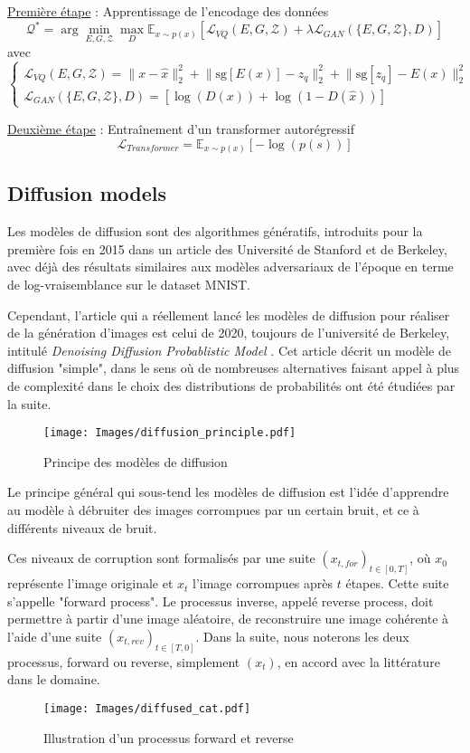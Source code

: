 \documentclass{article}
\begin{document}
\underline{Première étape} : Apprentissage de l'encodage des données
\large
$$
\mathcal{Q}^* = \arg \min_{E, G, \mathcal{Z}} \max_{D} \mathbb{E}_{x \sim p(x)}[\mathcal{L}_{VQ}(E, G, \mathcal{Z}) + \lambda \mathcal{L}_{GAN}(\{E, G, \mathcal{Z}\}, D)]
$$
\normalsize
avec
\large
$$
\begin{cases}
\mathcal{L}_{VQ}(E, G, \mathcal{Z}) = \lVert x - \hat{x} \rVert_2^2 +  \lVert\text{sg}[E(x)] - z_q \rVert_2^2 + \lVert\text{sg}[z_q] - E(x) \rVert_2^2 \\
\mathcal{L}_{GAN}(\{E, G, \mathcal{Z}\}, D) = [\log(D(x)) + \log(1 - D(\hat{x}))]
\end{cases}
$$
\normalsize


\underline{Deuxième étape} : Entraînement d'un transformer autorégressif
\large
$$
\mathcal{L}_{Transformer} = \mathbb{E}_{x \sim p(x)}[-\log(p(s))]
$$
\normalsize


\subsection{Diffusion models}
\label{sec:diffusion_models}

Les modèles de diffusion sont des algorithmes génératifs, introduits pour la première fois en 2015 dans un article des Université de Stanford et de Berkeley\cite{DIFF15}, avec déjà des résultats similaires aux modèles adversariaux de l'époque en terme de log-vraisemblance sur le dataset MNIST.

Cependant, l'article qui a réellement lancé les modèles de diffusion pour réaliser de la génération d'images est celui de 2020, toujours de l'université de Berkeley, intitulé \textit{Denoising Diffusion Probablistic Model} \cite{DIFF20}. Cet article décrit un modèle de diffusion "simple", dans le sens où de nombreuses alternatives faisant appel à plus de complexité dans le choix des distributions de probabilités ont été étudiées par la suite.

\begin{figure}[H]
    \centering
    \texttt{[image: Images/diffusion\_principle.pdf]}
    \caption{Principe des modèles de diffusion}
\end{figure}

Le principe général qui sous-tend les modèles de diffusion est l'idée d'apprendre au modèle à débruiter des images corrompues par un certain bruit, et ce à différents niveaux de bruit.

Ces niveaux de corruption sont formalisés par une suite $ (x_{t,for})_{t\in[0,T]}$, où $ x_0$ représente l'image originale et $x_t$ l'image corrompues après $t$ étapes. Cette suite s'appelle "forward process". Le processus inverse, appelé reverse process, doit permettre à partir d'une image aléatoire, de reconstruire une image cohérente à l'aide d'une suite $ (x_{t,rev})_{t\in[T,0]}$. Dans la suite, nous noterons les deux processus, forward ou reverse, simplement $(x_t)$, en accord avec la littérature dans le domaine.
\begin{figure}[H]
    \centering
    \texttt{[image: Images/diffused\_cat.pdf]}
    \caption{Illustration d'un processus forward et reverse}
\end{figure}
\end{document}
